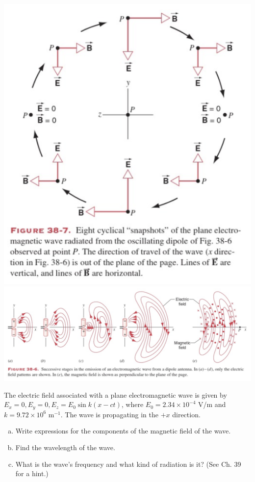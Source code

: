 \documentclass[12pt,letterpaper]{hmcpset}
\begin{document}
\begin{problem}[38E14:]
\begin{enumerate}[(a)]
			\begin{center}
				\includegraphics[scale = 0.3]{Fig_38-7} \includegraphics[scale = 0.3]{Fig_38-6}
			\end{center}
		\end{enumerate}
	\end{problem}
	\clearpage



	\begin{problem}[38E16:]
		The electric field associated with a plane electromagnetic wave is given by $E_x = 0, E_y = 0, E_z = E_0\sin{k(x - ct)}$, where $E_0 = 2.34 \times 10^{-4}$ V/m and $k = 9.72 \times 10^6$ m$^{-1}$.
		The wave is propagating in the $+x$ direction.
		\begin{enumerate}[(a)]
			\item Write expressions for the components of the magnetic field of the wave.
			\item Find the wavelength of the wave.
			\item What is the wave's frequency and what kind of radiation is it? (See Ch. 39 for a hint.)
		\end{enumerate}
	\end{problem}
	\clearpage
\end{document}
